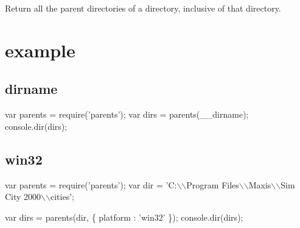Return all the parent directories of a directory, inclusive of that directory.

\href{http://travis-ci.org/substack/node-parents}{\tt }

\section*{example}

\subsection*{dirname}


\begin{DoxyCode}
var parents = require('parents');
var dirs = parents(\_\_dirname);
console.dir(dirs);
\end{DoxyCode}







\begin{DoxyCode}
\end{DoxyCode}


\subsection*{win32}


\begin{DoxyCode}
var parents = require('parents');
var dir = 'C:\(\backslash\)\(\backslash\)Program Files\(\backslash\)\(\backslash\)Maxis\(\backslash\)\(\backslash\)Sim City 2000\(\backslash\)\(\backslash\)cities';

var dirs = parents(dir, \{ platform : 'win32' \});
console.dir(dirs);
\end{DoxyCode}







\begin{DoxyCode}
\end{DoxyCode}


